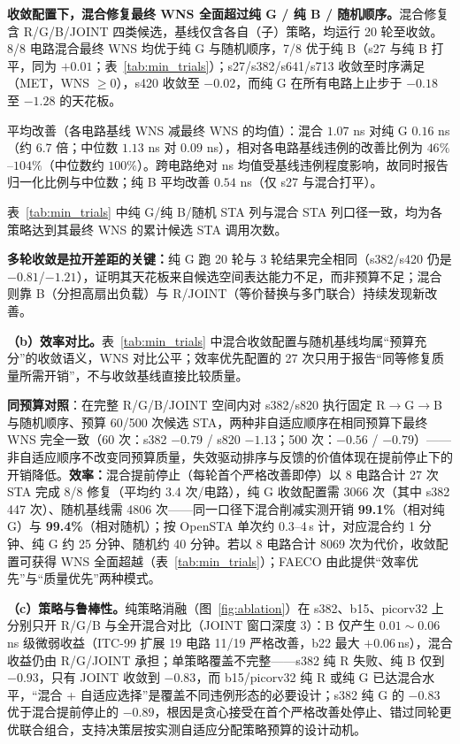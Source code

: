 \documentclass[journal]{IEEEtran}
\begin{document}
\textbf{收敛配置下，混合修复最终 WNS 全面超过纯 G / 纯 B / 随机顺序。}混合修复含 R/G/B/JOINT 四类候选，基线仅含各自（子）策略，均运行 20 轮至收敛。8/8 电路混合最终 WNS 均优于纯 G 与随机顺序，7/8 优于纯 B（s27 与纯 B 打平，同为 $+0.01$；表~\ref{tab:min_trials}）；s27/s382/s641/s713 收敛至时序满足（MET，WNS $\ge 0$），s420 收敛至 $-0.02$，而纯 G 在所有电路上止步于 $-0.18$ 至 $-1.28$ 的天花板。

平均改善（各电路基线 WNS 减最终 WNS 的均值）：混合 $1.07$ ns 对纯 G $0.16$ ns（约 6.7 倍；中位数 $1.13$ ns 对 $0.09$ ns），相对各电路基线违例的改善比例为 $46\%$--$104\%$（中位数约 $100\%$）。跨电路绝对 ns 均值受基线违例程度影响，故同时报告归一化比例与中位数；纯 B 平均改善 $0.54$ ns（仅 s27 与混合打平）。

表~\ref{tab:min_trials} 中纯 G/纯 B/随机 STA 列与混合 STA 列口径一致，均为各策略达到其最终 WNS 的累计候选 STA 调用次数。

\textbf{多轮收敛是拉开差距的关键：}纯 G 跑 20 轮与 3 轮结果完全相同（s382/s420 仍是 $-0.81$/$-1.21$），证明其天花板来自候选空间表达能力不足，而非预算不足；混合则靠 B（分担高扇出负载）与 R/JOINT（等价替换与多门联合）持续发现新改善。

\textbf{（b）效率对比。}表~\ref{tab:min_trials} 中混合收敛配置与随机基线均属“预算充分”的收敛语义，WNS 对比公平；效率优先配置的 27 次只用于报告“同等修复质量所需开销”，不与收敛基线直接比较质量。

\textbf{同预算对照}：在完整 R/G/B/JOINT 空间内对 s382/s820 执行固定 R$\rightarrow$G$\rightarrow$B 与随机顺序、预算 60/500 次候选 STA，两种非自适应顺序在相同预算下最终 WNS 完全一致（60 次：s382 $-0.79$ / s820 $-1.13$；500 次：$-0.56$ / $-0.79$）——非自适应顺序不改变同预算质量，失效驱动排序与反馈的价值体现在提前停止下的开销降低。\textbf{效率：}混合提前停止（每轮首个严格改善即停）以 8 电路合计 27 次 STA 完成 8/8 修复（平均约 3.4 次/电路），纯 G 收敛配置需 3066 次（其中 s382 447 次）、随机基线需 4806 次——同一口径下混合削减实测开销 \textbf{99.1\%}（相对纯 G）与 \textbf{99.4\%}（相对随机）；按 OpenSTA 单次约 0.3--4\,s 计，对应混合约 1 分钟、纯 G 约 25 分钟、随机约 40 分钟。若以 8 电路合计 8069 次为代价，收敛配置可获得 WNS 全面超越（表~\ref{tab:min_trials}）；FAECO 由此提供“效率优先”与“质量优先”两种模式。

\textbf{（c）策略与鲁棒性。}纯策略消融（图~\ref{fig:ablation}）在 s382、b15、picorv32 上分别只开 R/G/B 与全开混合对比（JOINT 窗口深度 3）：B 仅产生 $0.01\!\sim\!0.06\,$ns 级微弱收益（ITC-99 扩展 19 电路 11/19 严格改善，b22 最大 $+0.06\,$ns），混合收益仍由 R/G/JOINT 承担；单策略覆盖不完整——s382 纯 R 失败、纯 B 仅到 $-0.93$，只有 JOINT 收敛到 $-0.83$，而 b15/picorv32 纯 R 或纯 G 已达混合水平，“混合 + 自适应选择”是覆盖不同违例形态的必要设计；s382 纯 G 的 $-0.83$ 优于混合提前停止的 $-0.89$，根因是贪心接受在首个严格改善处停止、错过同轮更优联合组合，支持决策层按实测自适应分配策略预算的设计动机。
\end{document}

